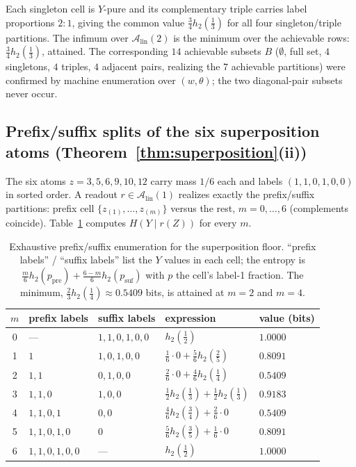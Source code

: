\documentclass[twocolumn,10pt]{article}
\theoremstyle{definition}
\theoremstyle{remark}
\newcommand{\cA}{\mathcal{A}}
\newcommand{\Alin}{\cA_{\mathrm{lin}}}
\newcommand{\hb}{h_2}
\begin{document}
Each singleton cell is $Y$-pure and its complementary triple carries label
proportions $2{:}1$, giving the common value
$\tfrac34 \hb(\tfrac13)$ for all four singleton/triple partitions. The
infimum over $\Alin(2)$ is the minimum over the achievable rows:
$\tfrac34 \hb(\tfrac13)$, attained. The corresponding $14$ achievable
subsets $B$ ($\emptyset$, full set, $4$ singletons, $4$ triples, $4$
adjacent pairs, realizing the $7$ achievable partitions) were
confirmed by machine enumeration over $(w, \theta)$;
the two diagonal-pair subsets never occur.

\subsection{Prefix/suffix splits of the six superposition atoms
(Theorem~\ref{thm:superposition}(ii))}
\label{app:enum-sup}

The six atoms $z = 3, 5, 6, 9, 10, 12$ carry mass $1/6$ each and labels
$(1, 1, 0, 1, 0, 0)$ in sorted order. A readout $r \in \Alin(1)$ realizes
exactly the prefix/suffix partitions: prefix cell
$\{z_{(1)}, \dots, z_{(m)}\}$ versus the rest, $m = 0, \dots, 6$
(complements coincide). Table~\ref{tab:app-sup} computes
$H(Y \mid r(Z))$ for every $m$.

\begin{table}[H]
\centering
\caption{Exhaustive prefix/suffix enumeration for the superposition floor.
``prefix labels'' / ``suffix labels'' list the $Y$ values in each cell;
the entropy is $\tfrac{m}{6} \hb(p_{\mathrm{pre}}) + \tfrac{6-m}{6}
\hb(p_{\mathrm{suf}})$ with $p$ the cell's label-1 fraction. The minimum,
$\tfrac23 \hb(\tfrac14) \approx 0.5409$ bits, is attained at $m = 2$ and
$m = 4$.}
\label{tab:app-sup}
\small
\begin{tabular}{cllll}
\toprule
$m$ & prefix labels & suffix labels & expression & value (bits) \\
\midrule
0 & --- & $1,1,0,1,0,0$ & $\hb(\tfrac12)$ & $1.0000$ \\
1 & $1$ & $1,0,1,0,0$ & $\tfrac16 \cdot 0 + \tfrac56 \hb(\tfrac25)$ &
$0.8091$ \\
2 & $1,1$ & $0,1,0,0$ & $\tfrac26 \cdot 0 + \tfrac46 \hb(\tfrac14)$ &
$\mathbf{0.5409}$ \\
3 & $1,1,0$ & $1,0,0$ & $\tfrac12 \hb(\tfrac13) + \tfrac12 \hb(\tfrac13)$
& $0.9183$ \\
4 & $1,1,0,1$ & $0,0$ & $\tfrac46 \hb(\tfrac34) + \tfrac26 \cdot 0$ &
$\mathbf{0.5409}$ \\
5 & $1,1,0,1,0$ & $0$ & $\tfrac56 \hb(\tfrac35) + \tfrac16 \cdot 0$ &
$0.8091$ \\
6 & $1,1,0,1,0,0$ & --- & $\hb(\tfrac12)$ & $1.0000$ \\
\bottomrule
\end{tabular}
\end{table}
\end{document}
